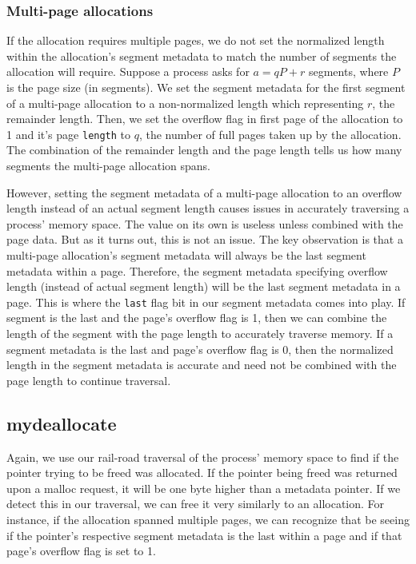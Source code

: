 \documentclass{article}
\begin{document}
\subsubsection{Multi-page allocations}
If the allocation requires multiple pages, we do not set the normalized length within the allocation's segment metadata to match the number of segments the allocation will require. Suppose a process asks for $a = qP + r$ segments, where $P$ is the page size (in segments). We set the segment metadata for the first segment of a multi-page allocation to a non-normalized length which representing $r$, the remainder length. Then, we set the overflow flag in first page of the allocation to 1 and it's page \texttt{length} to $q$, the number of full pages taken up by the allocation. The combination of the remainder length and the page length tells us how many segments the multi-page allocation spans.

However, setting the segment metadata of a multi-page allocation to an overflow length instead of an actual segment length causes issues in accurately traversing a process' memory space. The value on its own is useless unless combined with the page data. But as it turns out, this is not an issue. The key observation is that a multi-page allocation's segment metadata will always be the last segment metadata within a page. Therefore, the segment metadata specifying overflow length (instead of actual segment length) will be the last segment metadata in a page. This is where the \verb|last| flag bit in our segment metadata comes into play. If segment is the last and the page's overflow flag is 1, then we can combine the length of the segment with the page length to accurately traverse memory. If a segment metadata is the last and page's overflow flag is 0, then the normalized length in the segment metadata is accurate and need not be combined with the page length to continue traversal.

\subsection{mydeallocate}
Again, we use our rail-road traversal of the process' memory space to find if the pointer trying to be freed was allocated. If the pointer being freed was returned upon a malloc request, it will be one byte higher than a metadata pointer. If we detect this in our traversal, we can free it very similarly to an allocation. For instance, if the allocation spanned multiple pages, we can recognize that be seeing if the pointer's respective segment metadata is the last within a page and if that page's overflow flag is set to 1.
\end{document}
